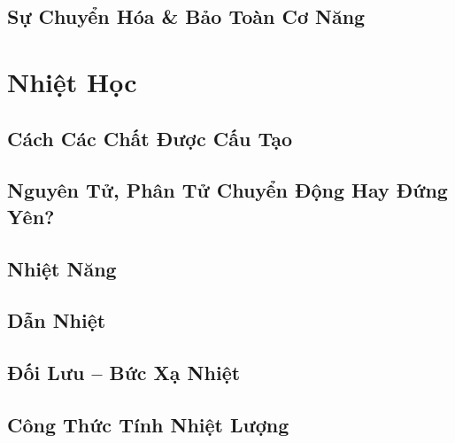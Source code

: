 \documentclass{article}
\numberwithin{equation}{section}
\begin{document}

\subsection{Sự Chuyển Hóa \& Bảo Toàn Cơ Năng}


\section{Nhiệt Học}

\subsection{Cách Các Chất Được Cấu Tạo}


\subsection{Nguyên Tử, Phân Tử Chuyển Động Hay Đứng Yên?}


\subsection{Nhiệt Năng}


\subsection{Dẫn Nhiệt}


\subsection{Đối Lưu -- Bức Xạ Nhiệt}


\subsection{Công Thức Tính Nhiệt Lượng}
\end{document}
